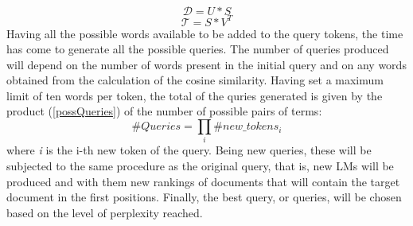 \begin{equation}\label{matrixD}
    \mathcal{D} = U*S
\end{equation}
\begin{equation}\label{matrixT}
    \mathcal{T} = S*V^T
\end{equation}
Having all the possible words available to be added to the query tokens, the 
time has come to generate all the possible queries. The number of queries 
produced will depend on the number of words present in the initial query and 
on any words obtained from the calculation of the cosine similarity. Having 
set a maximum limit of ten words per token, the total of the quries generated 
is given by the product (\ref{possQueries}) of the number of possible pairs of terms: 
\begin{equation}\label{possQueries}
    \#Queries = \prod_i \#new\_tokens_i
\end{equation}
where \emph{i} is the i-th new token of the query. Being new 
queries, these will be subjected to the same procedure as the original query, 
that is, new LMs will be produced and with them new rankings of documents 
that will contain the target document in the first positions. Finally, the best 
query, or queries, will be chosen based on the level of perplexity reached.